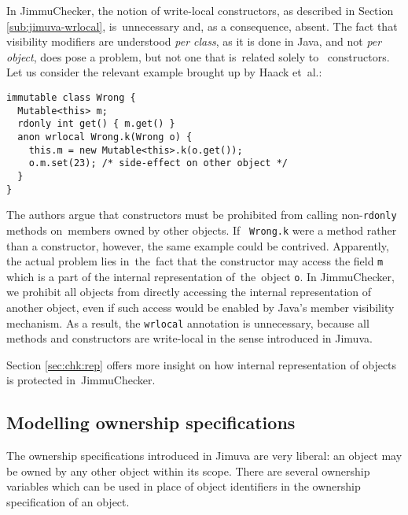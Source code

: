 \documentclass{pracamgr}
\theoremstyle{break}
\theoremstyle{break}
\theoremstyle{break}
\begin{document}
In JimmuChecker, the notion of write-local constructors, as described
in Section \ref{sub:jimuva-wrlocal}, is~unnecessary and, as a
consequence, absent. The fact that visibility modifiers are understood
\emph{per class}, as it is done in Java, and not \emph{per object},
does pose a problem, but not one that is~related solely to~
constructors. Let us consider the relevant example brought up by Haack
et~al.:
\begin{lstlisting}[morekeywords={immutable, anon, wrlocal, rdonly}]
immutable class Wrong {
  Mutable<this> m; 
  rdonly int get() { m.get() }
  anon wrlocal Wrong.k(Wrong o) {
    this.m = new Mutable<this>.k(o.get()); 
    o.m.set(23); /* side-effect on other object */
  }
}
\end{lstlisting}
The authors argue that constructors must be prohibited from calling
non-\texttt{rdonly} me\-thods on~members owned by other objects. If~
\texttt{Wrong.k} were a method rather than a constructor, however, the
same example could be contrived. Apparently, the actual problem lies
in~the~fact that the constructor may access the field \texttt{m} which
is a part of the internal representation of~the~object \texttt{o}. In
JimmuChecker, we prohibit all objects from directly accessing the
internal representation of another object, even if such access would
be enabled by Java's member visibility mechanism. As a result, the
\texttt{wrlocal} annotation is unnecessary, because all methods and
constructors are write-local in the sense introduced in Jimuva.

Section \ref{sec:chk:rep} offers more insight on how internal
representation of objects is protected in~JimmuChecker. 


\subsection{Modelling ownership specifications}
\label{sec:mod:ownership}

The ownership specifications introduced in Jimuva are very liberal: an
object may be owned by any other object within its scope.  There are
several ownership variables which can be used in place of object
identifiers in the ownership specification of an object.
\end{document}
